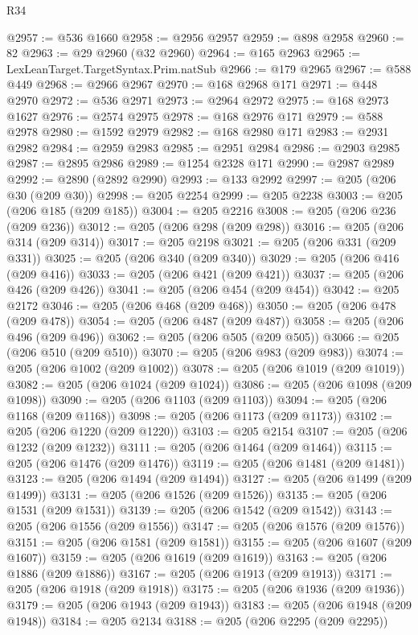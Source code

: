 \begin{lexlean}{R34}
\begin{coremodule}
@2957 := @536 @1660
@2958 := @2956 @2957
@2959 := @898 @2958
@2960 := 82
@2963 := @29 @2960 (@32 @2960)
@2964 := @165 @2963
@2965 := LexLeanTarget.TargetSyntax.Prim.natSub
@2966 := @179 @2965
@2967 := @588 @449
@2968 := @2966 @2967
@2970 := @168 @2968 @171
@2971 := @448 @2970
@2972 := @536 @2971
@2973 := @2964 @2972
@2975 := @168 @2973 @1627
@2976 := @2574 @2975
@2978 := @168 @2976 @171
@2979 := @588 @2978
@2980 := @1592 @2979
@2982 := @168 @2980 @171
@2983 := @2931 @2982
@2984 := @2959 @2983
@2985 := @2951 @2984
@2986 := @2903 @2985
@2987 := @2895 @2986
@2989 := @1254 @2328 @171
@2990 := @2987 @2989
@2992 := @2890 (@2892 @2990)
@2993 := @133 @2992
@2997 := @205 (@206 @30 (@209 @30))
@2998 := @205 @2254
@2999 := @205 @2238
@3003 := @205 (@206 @185 (@209 @185))
@3004 := @205 @2216
@3008 := @205 (@206 @236 (@209 @236))
@3012 := @205 (@206 @298 (@209 @298))
@3016 := @205 (@206 @314 (@209 @314))
@3017 := @205 @2198
@3021 := @205 (@206 @331 (@209 @331))
@3025 := @205 (@206 @340 (@209 @340))
@3029 := @205 (@206 @416 (@209 @416))
@3033 := @205 (@206 @421 (@209 @421))
@3037 := @205 (@206 @426 (@209 @426))
@3041 := @205 (@206 @454 (@209 @454))
@3042 := @205 @2172
@3046 := @205 (@206 @468 (@209 @468))
@3050 := @205 (@206 @478 (@209 @478))
@3054 := @205 (@206 @487 (@209 @487))
@3058 := @205 (@206 @496 (@209 @496))
@3062 := @205 (@206 @505 (@209 @505))
@3066 := @205 (@206 @510 (@209 @510))
@3070 := @205 (@206 @983 (@209 @983))
@3074 := @205 (@206 @1002 (@209 @1002))
@3078 := @205 (@206 @1019 (@209 @1019))
@3082 := @205 (@206 @1024 (@209 @1024))
@3086 := @205 (@206 @1098 (@209 @1098))
@3090 := @205 (@206 @1103 (@209 @1103))
@3094 := @205 (@206 @1168 (@209 @1168))
@3098 := @205 (@206 @1173 (@209 @1173))
@3102 := @205 (@206 @1220 (@209 @1220))
@3103 := @205 @2154
@3107 := @205 (@206 @1232 (@209 @1232))
@3111 := @205 (@206 @1464 (@209 @1464))
@3115 := @205 (@206 @1476 (@209 @1476))
@3119 := @205 (@206 @1481 (@209 @1481))
@3123 := @205 (@206 @1494 (@209 @1494))
@3127 := @205 (@206 @1499 (@209 @1499))
@3131 := @205 (@206 @1526 (@209 @1526))
@3135 := @205 (@206 @1531 (@209 @1531))
@3139 := @205 (@206 @1542 (@209 @1542))
@3143 := @205 (@206 @1556 (@209 @1556))
@3147 := @205 (@206 @1576 (@209 @1576))
@3151 := @205 (@206 @1581 (@209 @1581))
@3155 := @205 (@206 @1607 (@209 @1607))
@3159 := @205 (@206 @1619 (@209 @1619))
@3163 := @205 (@206 @1886 (@209 @1886))
@3167 := @205 (@206 @1913 (@209 @1913))
@3171 := @205 (@206 @1918 (@209 @1918))
@3175 := @205 (@206 @1936 (@209 @1936))
@3179 := @205 (@206 @1943 (@209 @1943))
@3183 := @205 (@206 @1948 (@209 @1948))
@3184 := @205 @2134
@3188 := @205 (@206 @2295 (@209 @2295))

\end{coremodule}
\end{lexlean}
